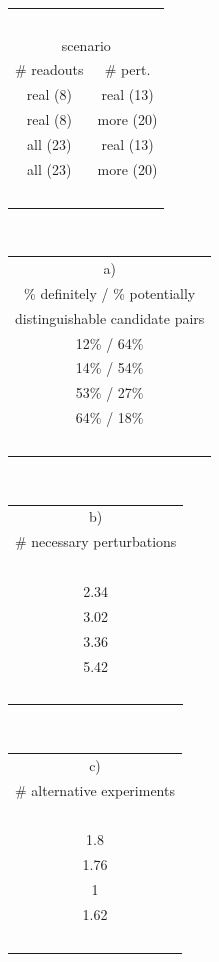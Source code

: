 \begin{table}[!t]

\begin{center}
\sffamily
\small
\begin{tabular}{cc}
 ~  \\
 \multicolumn{2}{c}{scenario}  \\
 \# readouts & \# pert.\\
 \cellcolor{gray}real (8) & \cellcolor{gray}real (13)\\
 \cellcolor{gray}real (8) & \cellcolor{gray}more (20) \\
 \cellcolor{gray}all (23) & \cellcolor{gray}real (13)\\
 \cellcolor{gray}all (23) & \cellcolor{gray}more (20) \\
 ~  \\
\end{tabular}
~
\begin{tabular}{c}
 a)  \\
 \cellcolor{gray} \% definitely / \% potentially \\
 \cellcolor{gray} distinguishable candidate pairs \\
 12\% / 64\% \\
 14\% / 54\% \\
 53\% / 27\% \\
 64\% / 18\%  \\
 ~  \\
\end{tabular}
~~~~
\begin{tabular}{c}
 b)  \\
 \cellcolor{gray} \# necessary perturbations  \\
 \cellcolor{gray} ~  \\
 2.34  \\
 3.02  \\
 3.36  \\
 5.42  \\
 ~  \\
\end{tabular}
~~~~
\begin{tabular}{c}
 c)  \\
 \cellcolor{gray} \# alternative  experiments  \\
 \cellcolor{gray} ~  \\
 1.8   \\
 1.76  \\
 1     \\
 1.62  \\
 ~  \\

\end{tabular}
\end{center}
\end{table}
